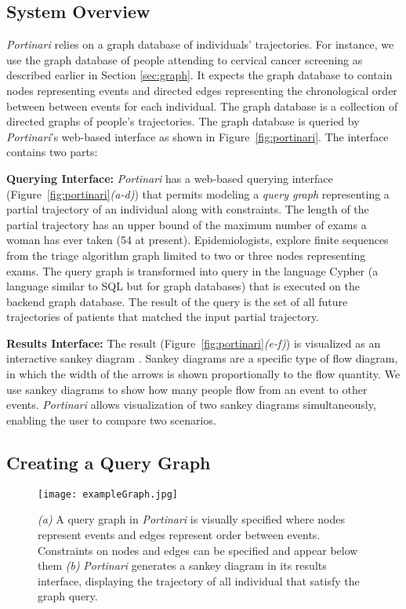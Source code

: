 \documentclass[10pt, conference]{IEEEtran}
\begin{document}
\subsection{System Overview}
\label{sec:so}

\textit{Portinari} relies on a  graph database of individuals' trajectories. For instance, we use the graph database of people attending to cervical cancer screening as described earlier in Section \ref{sec:graph}. It expects the graph database to contain nodes representing events and directed edges representing the chronological order between between events for each individual. The graph database is a collection of directed graphs of people's trajectories. The graph database is queried by \textit{Portinari}'s web-based interface as shown in Figure~\ref{fig:portinari}. The interface contains two parts:

\noindent \textbf{Querying Interface:} \textit{Portinari} has a web-based  querying interface (Figure~\ref{fig:portinari}\textit{(a-d)}) that permits modeling a \emph{query graph} representing a partial trajectory of an individual along with constraints. The length of the partial trajectory has an upper bound of the maximum number of exams a woman has ever taken (54 at present). Epidemiologists, explore finite sequences from the triage algorithm graph limited to two or three nodes representing exams. The query graph is transformed into query in the language Cypher \cite{team2013cypher} (a language similar to SQL but for graph databases) that is executed on the backend  graph database. The result of the query is the set of all future trajectories of patients that matched the input partial trajectory. 

\noindent \textbf{Results Interface:} The result (Figure~\ref{fig:portinari}\textit{(e-f)}) is visualized as an interactive sankey diagram \cite{riehmann2005interactive}. Sankey diagrams are a specific type of flow diagram, in which the width of the arrows is shown proportionally to the flow quantity. We use sankey diagrams to show how many people flow from an event to other events. \textit{Portinari} allows visualization of two sankey diagrams simultaneously, enabling the user to compare two scenarios.



\subsection{Creating a Query Graph}
\label{sec:qi}


\begin{figure}[t]
	\centering
\texttt{[image: exampleGraph.jpg]}
\caption{ \textit{(a)} A query graph in \textit{Portinari} is visually specified where nodes represent events and edges represent order between events. Constraints on nodes and edges can be specified and appear below them \textit{(b)} \textit{Portinari} generates a sankey diagram in its results interface, displaying the trajectory of all individual that satisfy the graph query.}
\label{fig:query-int}
\end{figure}
\end{document}
